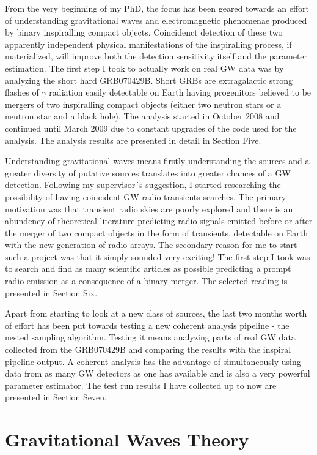 \documentclass[epsf]{article}
\begin{document}
From the very beginning of my PhD, the focus has been geared towards an effort of understanding gravitational waves and electromagnetic phenomenae produced by binary inspiralling compact objects. Coincidenct detection of these two apparently independent physical manifestations of the inspiralling process, if materialized, will improve both the detection sensitivity itself and the parameter estimation. The first step I took to actually work on real GW data was by analyzing the short hard GRB070429B. Short GRBs are extragalactic strong flashes of $\gamma$ radiation easily detectable on Earth having progenitors believed to be mergers of two inspiralling compact objects (either two neutron stars or a neutron star and a black hole). The analysis started in October 2008 and continued until March 2009 due to constant upgrades of the code used for the analysis. The analysis results are presented in detail in Section Five. 

Understanding gravitational waves means firstly understanding the sources and a greater diversity of putative sources translates into greater chances of a GW detection. Following my supervisor´s suggestion, I started researching the possibility of having coincident GW-radio transients searches. The primary motivation was that transient radio skies are poorly explored and there is an abundency of theoretical literature predicting radio signals emitted before or after the merger of two compact objects in the form of transients, detectable on Earth with the new generation of radio arrays. The secondary reason for me to start such a project was that it simply sounded very exciting! The first step I took was to search and find as many scientific articles as possible predicting a prompt radio emission as a consequence of a binary merger. The selected reading is presented in Section Six.

Apart from starting to look at a new class of sources, the last two months worth of effort has been put towards testing a new coherent analysis pipeline - the nested sampling algorithm. Testing it means analyzing parts of real GW data collected from the GRB070429B and comparing the results with the inspiral pipeline output. A coherent analysis has the advantage of simultaneously using data from as many GW detectors as one has available and is also a very powerful parameter estimator. The test run results I have collected up to now are presented in Section Seven.     

\section{Gravitational Waves Theory}
\end{document}
